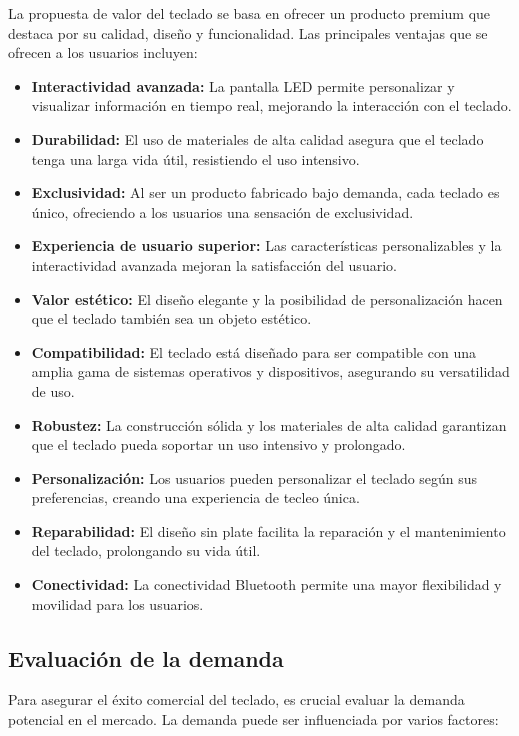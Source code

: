 La propuesta de valor del teclado se basa en ofrecer un producto premium que destaca por su calidad, diseño y funcionalidad. Las principales ventajas que se ofrecen a los usuarios incluyen:

\begin{itemize}
    \item \textbf{Interactividad avanzada:} La pantalla LED permite personalizar y visualizar información en tiempo real, mejorando la interacción con el teclado.
    \item \textbf{Durabilidad:} El uso de materiales de alta calidad asegura que el teclado tenga una larga vida útil, resistiendo el uso intensivo.
    \item \textbf{Exclusividad:} Al ser un producto fabricado bajo demanda, cada teclado es único, ofreciendo a los usuarios una sensación de exclusividad.
    \item \textbf{Experiencia de usuario superior:} Las características personalizables y la interactividad avanzada mejoran la satisfacción del usuario.
    \item \textbf{Valor estético:} El diseño elegante y la posibilidad de personalización hacen que el teclado también sea un objeto estético.
    \item \textbf{Compatibilidad:} El teclado está diseñado para ser compatible con una amplia gama de sistemas operativos y dispositivos, asegurando su versatilidad de uso.
    \item \textbf{Robustez:} La construcción sólida y los materiales de alta calidad garantizan que el teclado pueda soportar un uso intensivo y prolongado.
    \item \textbf{Personalización:} Los usuarios pueden personalizar el teclado según sus preferencias, creando una experiencia de tecleo única.
    \item \textbf{Reparabilidad:} El diseño sin plate facilita la reparación y el mantenimiento del teclado, prolongando su vida útil.
    \item \textbf{Conectividad:} La conectividad Bluetooth permite una mayor flexibilidad y movilidad para los usuarios.
\end{itemize}

\subsection{Evaluación de la demanda}

Para asegurar el éxito comercial del teclado, es crucial evaluar la demanda potencial en el mercado. La demanda puede ser influenciada por varios factores:


